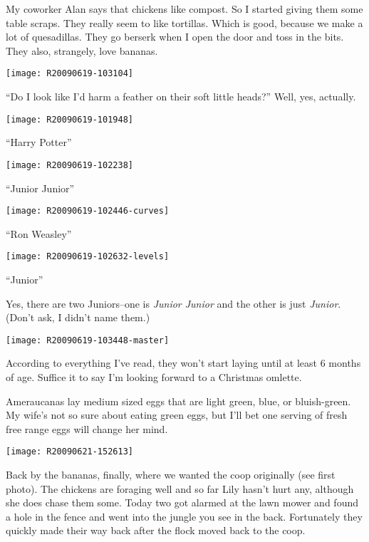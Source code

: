 My coworker Alan says that chickens like compost.  So I started giving
them some table scraps.  They really seem to like tortillas.  Which is
good, because we make a lot of quesadillas.  They go berserk when I open
the door and toss in the bits.  They also, strangely, love bananas.
\newpage

\texttt{[image: R20090619-103104]}

``Do I look like I'd harm a feather on their soft little heads?''  Well,
yes, actually. 
\newpage

\texttt{[image: R20090619-101948]}

\begin{center}{\Large ``Harry Potter'' }\end{center}
\newpage

\texttt{[image: R20090619-102238]}

\begin{center}{\Large ``Junior Junior'' }\end{center}
\newpage

\texttt{[image: R20090619-102446-curves]}

\begin{center}{\Large ``Ron Weasley'' }\end{center}
\newpage

\texttt{[image: R20090619-102632-levels]}

\begin{center}{\Large ``Junior'' }\end{center}

Yes, there are two Juniors--one is {\em Junior Junior} and the other
is just {\em Junior}. (Don't ask, I didn't name them.) 
\newpage

\texttt{[image: R20090619-103448-master]}

According to everything I've read, they won't start laying until at
least 6 months of age. Suffice it to say I'm looking forward to a
Christmas omlette. 

Ameraucanas lay medium sized eggs that are light green, blue, or
bluish-green. My wife's not so sure about eating green eggs, but I'll
bet one serving of fresh free range eggs will change her mind.
\newpage

\texttt{[image: R20090621-152613]}

Back by the bananas, finally, where we wanted the coop originally (see
first photo). The chickens are foraging well and so far Lily hasn't hurt
any, although she does chase them some. Today two got alarmed at the
lawn mower and found a hole in the fence and went into the jungle you
see in the back. Fortunately they quickly made their way back after the
flock moved back to the coop. 

